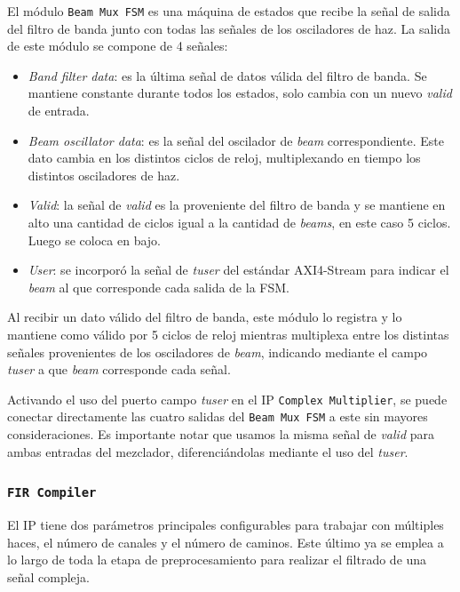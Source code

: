 \documentclass[../../main.tex]{subfiles}
\begin{document}
El módulo \texttt{Beam Mux FSM} es una máquina de estados que recibe la señal de salida del filtro de banda junto con todas las señales de los osciladores de haz. La salida de este módulo se compone de 4 señales:
\begin{itemize}
    \item \textit{Band filter data}: es la última señal de datos válida del filtro de banda. Se mantiene constante durante todos los estados, solo cambia con un nuevo \textit{valid} de entrada.
    \item \textit{Beam oscillator data}: es la señal del oscilador de \textit{beam} correspondiente. Este dato cambia en los distintos ciclos de reloj, multiplexando en tiempo los distintos osciladores de haz.
    \item \textit{Valid}: la señal de \textit{valid} es la proveniente del filtro de banda y se mantiene en alto una cantidad de ciclos igual a la cantidad de \textit{beams}, en este caso 5 ciclos. Luego se coloca en bajo.
    \item \textit{User}: se incorporó la señal de \textit{tuser} del estándar AXI4-Stream\cite{AXI-4-stream} para indicar el \textit{beam} al que corresponde cada salida de la FSM.
\end{itemize}

Al recibir un dato válido del filtro de banda, este módulo lo registra y lo mantiene como válido por 5 ciclos de reloj mientras multiplexa entre los distintas señales provenientes de los osciladores de \textit{beam}, indicando mediante el campo \textit{tuser} a que \textit{beam} corresponde cada señal.

Activando el uso del puerto campo \textit{tuser} en el IP \texttt{Complex Multiplier}, se puede conectar directamente las cuatro salidas del \texttt{Beam Mux FSM} a este sin mayores consideraciones. Es importante notar que usamos la misma señal de \textit{valid} para ambas entradas del mezclador, diferenciándolas mediante el uso del \textit{tuser}.

\subsubsection{\texttt{FIR Compiler}}
El IP tiene dos parámetros principales configurables para trabajar con múltiples haces, el número de canales y el número de caminos\cite{fir-compiler}. Este último ya se emplea a lo largo de toda la etapa de preprocesamiento para realizar el filtrado de una señal compleja.
\end{document}
